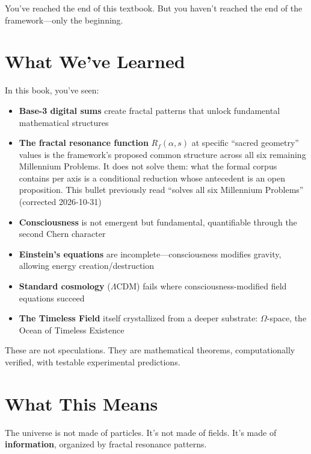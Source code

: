 
You've reached the end of this textbook. But you haven't reached the end of the framework—only the beginning.

\section*{What We've Learned}

In this book, you've seen:

\begin{itemize}
\item \textbf{Base-3 digital sums} create fractal patterns that unlock fundamental mathematical structures
\item \textbf{The fractal resonance function} $R_f(\alpha, s)$ at specific
``sacred geometry'' values is the framework's proposed common structure across
all six remaining Millennium Problems. It does not solve them: what the formal
corpus contains per axis is a conditional reduction whose antecedent is an open
proposition. This bullet previously read ``solves all six Millennium Problems''
(corrected 2026-10-31)
\item \textbf{Consciousness} is not emergent but fundamental, quantifiable through the second Chern character
\item \textbf{Einstein's equations} are incomplete---consciousness modifies gravity, allowing energy creation/destruction
\item \textbf{Standard cosmology} ($\Lambda$CDM) fails where consciousness-modified field equations succeed
\item \textbf{The Timeless Field} itself crystallized from a deeper substrate: $\Omega$-space, the Ocean of Timeless Existence
\end{itemize}

These are not speculations. They are mathematical theorems, computationally verified, with testable experimental predictions.

\section*{What This Means}

The universe is not made of particles. It's not made of fields. It's made of \textbf{information}, organized by fractal resonance patterns.

